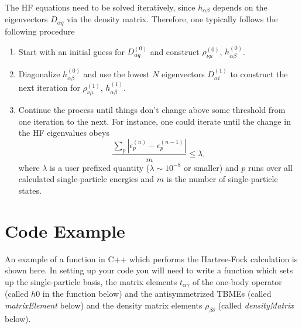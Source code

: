 \documentclass[letterpaper,12pt]{article}
\begin{document}
The HF equations need to be solved iteratively, since $h_{\alpha\beta}$ depends on the eigenvectors $D_{\alpha q}$ via the density matrix. Therefore, one typically follows the following procedure
\begin{enumerate}
\item Start with an initial guess for $D^{(0)}_{\alpha q}$ and construct $\rho^{(0)}_{\nu\mu}$, $h^{(0)}_{\alpha\beta}$.
\item Diagonalize $h^{(0)}_{\alpha\beta}$ and use the lowest $N$ eigenvectors $D^{(1)}_{\alpha i}$ to construct the next iteration for $\rho^{(1)}_{\nu\mu}$, $h^{(1)}_{\alpha\beta}$. 
\item Continue the process until things don't change above some threshold from one iteration to the next.  For instance, one could iterate until the change in the HF eigenvalues obeys
\[
\frac{\sum_{p} |\epsilon_p^{(n)}-\epsilon_p^{(n-1)}|}{m}\le \lambda,  
\]
where $\lambda$ is a user prefixed quantity ($\lambda \sim 10^{-8}$ or smaller) and $p$ runs over all calculated single-particle
energies and $m$ is the number of single-particle states. 
\end{enumerate}


\section{Code Example}
  
An example of a function in C++ which performs the Hartree-Fock calculation is shown here. In setting up your code you will need to write a function which sets up the single-particle basis, the matrix elements $t_{\alpha\gamma}$ of the one-body operator (called $h0$ in the function below) and the antisymmetrized TBMEs (called {\em matrixElement} below) and the density matrix elements $\rho_{\beta\delta}$ (called {\em densityMatrix} below). 
\end{document}
